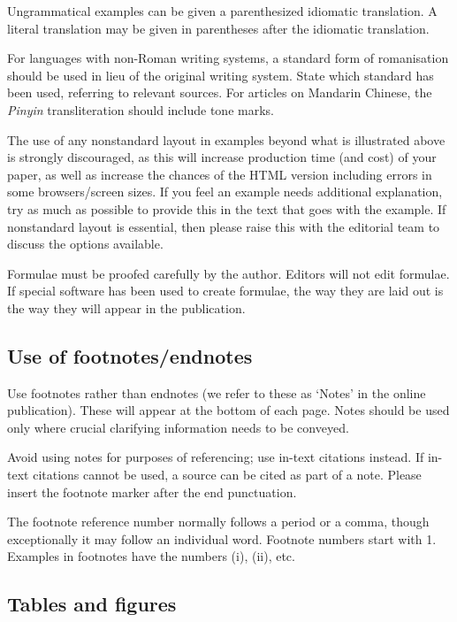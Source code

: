 \documentclass[charis,linguex]{glossa}
\begin{document}
Ungrammatical examples can be given a parenthesized idiomatic translation. A literal translation may be given in parentheses after the idiomatic translation.

For languages with non-Roman writing systems, a standard form of romanisation should be used in lieu of the original writing system. State which standard has been used, referring to relevant sources. For articles on Mandarin Chinese, the \emph{Pinyin} transliteration should include tone marks.

The use of any nonstandard layout in examples beyond what is illustrated above is strongly discouraged, as this will increase production time (and cost) of your paper, as well as increase the chances of the HTML version including errors in some browsers/screen sizes. If you feel an example needs additional explanation, try as much as possible to provide this in the text that goes with the example. If nonstandard layout is essential, then please raise this with the editorial team to discuss the options available.

Formulae must be proofed carefully by the author. Editors will not edit formulae. If special software has been used to create formulae, the way they are laid out is the way they will appear in the publication.

\subsection{Use of footnotes/endnotes}\label{fn}

Use footnotes rather than endnotes (we refer to these as ‘Notes’ in the online publication). These will appear at the bottom of each page. Notes should be used only where crucial clarifying information needs to be conveyed.

Avoid using notes for purposes of referencing; use in-text citations instead. If in-text citations cannot be used, a source can be cited as part of a note. Please insert the footnote marker after the end punctuation.

The footnote reference number normally follows a period or a comma, though exceptionally it may follow an individual word. Footnote numbers start with 1. Examples in footnotes have the numbers (i), (ii), etc.

\subsection{Tables and figures}
\end{document}
